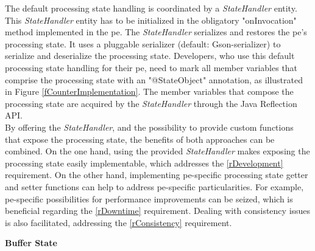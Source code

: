 The default processing state handling is coordinated by a \textit{StateHandler} entity. This \textit{StateHandler} entity has to be initialized in the obligatory "onInvocation" method implemented in the \gls{pe}. The \textit{StateHandler} serializes and restores the \gls{pe}'s processing state. It uses a pluggable serializer (default: Gson-serializer) to serialize and deserialize the processing state. Developers, who use this default processing state handling for their \gls{pe}, need to mark all member variables that comprise the processing state with an "@StateObject" annotation, as illustrated in Figure \ref{fCounterImplementation}. The member variables that compose the processing state are acquired by the \textit{StateHandler} through the Java Reflection API.\\
By offering the \textit{StateHandler}, and the possibility to provide custom functions that expose the processing state, the benefits of both approaches can be combined. On the one hand, using the provided \textit{StateHandler} makes exposing the processing state easily implementable, which addresses the \ref{rDevelopment} requirement. On the other hand, implementing \gls{pe}-specific processing state getter and setter functions can help to address \gls{pe}-specific particularities. For example, \gls{pe}-specific possibilities for performance improvements can be seized, which is beneficial regarding the \ref{rDowntime} requirement. Dealing with consistency issues is also facilitated, addressing the \ref{rConsistency} requirement.\par


\textbf{Buffer State}\par


